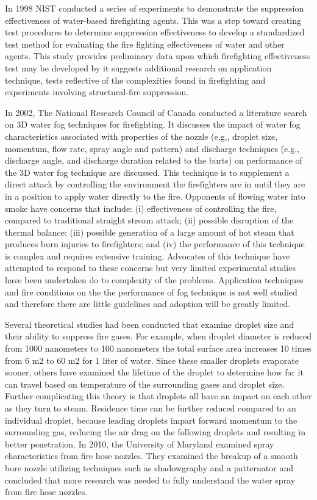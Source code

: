 \documentclass{article}
\begin{document}
In 1998 NIST conducted a series of experiments to demonstrate the suppression effectiveness of water-based firefighting agents. This was a step toward creating test procedures to determine suppression effectiveness to develop a standardized test method for evaluating the fire fighting effectiveness of water and other agents. This study provides preliminary data upon which firefighting effectiveness test may be developed by it suggests additional research on application technique, tests reflective of the complexities found in firefighting and experiments involving structural-fire suppression.  

In 2002, The National Research Council of Canada conducted a literature search on 3D water fog techniques for firefighting. It discusses the impact of water fog characteristics associated with properties of the nozzle (e,g,, droplet size, momentum, flow rate, spray angle and pattern) and discharge techniques (e.g., discharge angle, and discharge duration related to the burts) on performance of the 3D water fog technique are discussed. This technique is to supplement a direct attack by controlling the environment the firefighters are in until they are in a position to apply water directly to the fire. Opponents of flowing water into smoke have concerns that include: (i) effectiveness of controlling the fire, compared to traditional straight stream attack; (ii) possible disruption of the thermal balance; (iii) possible generation of a large amount of hot steam that produces burn injuries to firefighters; and (iv) the performance of this technique is complex and requires extensive training. Advocates of this technique have attempted to respond to these concerns but very limited experimental studies have been undertaken do to complexity of the problems. Application techniques and fire conditions on the the performance of fog technique is not well studied and therefore there are little guidelines and adoption will be greatly limited.

Several theoretical studies had been conducted that examine droplet size and their ability to suppress fire gases. For example, when droplet diameter is reduced from 1000 nanometers to 100 nanometers the total surface area increases 10 times from 6 m2 to 60 m2 for 1 liter of water. Since these smaller droplets evaporate sooner, others have examined the lifetime of the droplet to determine how far it can travel based on temperature of the surrounding gases and droplet size. Further complicating this theory is that droplets all have an impact on each other as they turn to steam. Residence time can be further reduced compared to an individual droplet, because leading droplets impart forward momentum to the surrounding gas, reducing the air drag on the following droplets and resulting in better penetration. In 2010, the University of Maryland examined spray characteristics from fire hose nozzles. They examined the breakup of a smooth bore nozzle utilizing techniques such as shadowgraphy and a patternator and concluded that more research was needed to fully understand the water spray from fire hose nozzles.  
\end{document}
